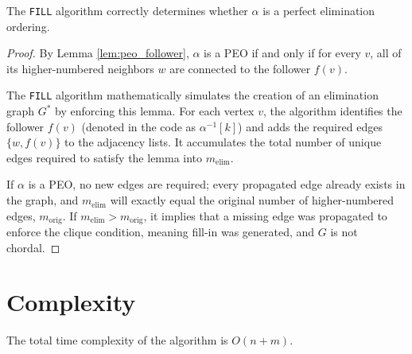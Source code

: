 \begin{theorem}
The \texttt{FILL} algorithm correctly determines whether $\alpha$ is a perfect elimination ordering.
\end{theorem}
\begin{proof}
By Lemma \ref{lem:peo_follower}, $\alpha$ is a PEO if and only if for every $v$, all of its higher-numbered neighbors $w$ are connected to the follower $f(v)$. 

The \texttt{FILL} algorithm mathematically simulates the creation of an elimination graph $G^*$ by enforcing this lemma. For each vertex $v$, the algorithm identifies the follower $f(v)$ (denoted in the code as $\alpha^{-1}[k]$) and adds the required edges $\{w, f(v)\}$ to the adjacency lists. It accumulates the total number of unique edges required to satisfy the lemma into $m_{\text{elim}}$.

If $\alpha$ is a PEO, no new edges are required; every propagated edge already exists in the graph, and $m_{\text{elim}}$ will exactly equal the original number of higher-numbered edges, $m_{\text{orig}}$. If $m_{\text{elim}} > m_{\text{orig}}$, it implies that a missing edge was propagated to enforce the clique condition, meaning fill-in was generated, and $G$ is not chordal.
\end{proof}

\section{Complexity}

\begin{theorem}
The total time complexity of the algorithm is $O(n + m)$.
\end{theorem}

